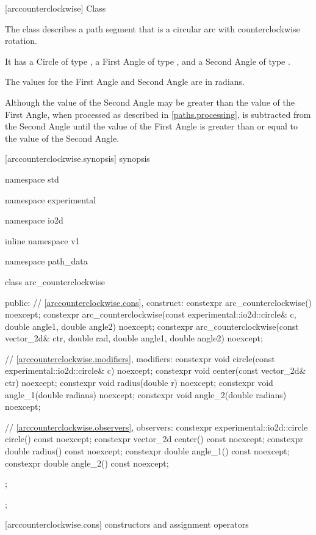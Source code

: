  [arccounterclockwise] {Class }

\pnum
{}
The class  describes a path segment that is a circular arc with counterclockwise rotation.

\pnum
It has a Circle of type , a First Angle of type , and a Second Angle of type .

\pnum
The values for the First Angle and Second Angle are in radians.

\pnum
\enternote
Although the value of the Second Angle may be greater than the value of the First Angle, when processed as described in \ref{paths.processing},  is subtracted from the Second Angle until the value of the First Angle is greater than or equal to the value of the Second Angle.
\exitnote

 [arccounterclockwise.synopsis] { synopsis}

\begin{codeblock}
namespace std { namespace experimental { namespace io2d { inline namespace v1 {
  namespace path_data {
    class arc_counterclockwise {
    public:
      // \ref{arccounterclockwise.cons}, construct:
      constexpr arc_counterclockwise() noexcept;
      constexpr arc_counterclockwise(const experimental::io2d::circle& c,
        double angle1, double angle2) noexcept;
      constexpr arc_counterclockwise(const vector_2d& ctr, double rad,
        double angle1, double angle2) noexcept;

      // \ref{arccounterclockwise.modifiers}, modifiers:
      constexpr void circle(const experimental::io2d::circle& c) noexcept;
      constexpr void center(const vector_2d& ctr) noexcept;
      constexpr void radius(double r) noexcept;
      constexpr void angle_1(double radians) noexcept;
      constexpr void angle_2(double radians) noexcept;

      // \ref{arccounterclockwise.observers}, observers:
      constexpr experimental::io2d::circle circle() const noexcept;
      constexpr vector_2d center() const noexcept;
      constexpr double radius() const noexcept;
      constexpr double angle_1() const noexcept;
      constexpr double angle_2() const noexcept;
    };
  };
} } } }
\end{codeblock}

 [arccounterclockwise.cons] { constructors and assignment operators}

